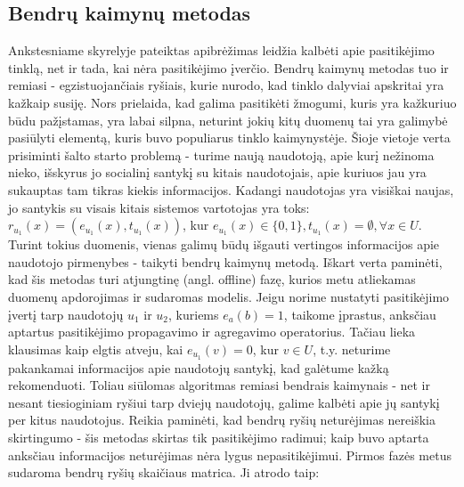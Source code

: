 \documentclass{VUMIFInfMagistrinis}
\begin{document}



\subsection{Bendrų kaimynų metodas}
Ankstesniame skyrelyje pateiktas apibrėžimas leidžia kalbėti apie pasitikėjimo tinklą, net ir tada, kai nėra pasitikėjimo įverčio. Bendrų kaimynų metodas tuo ir remiasi - egzistuojančiais ryšiais, kurie nurodo, kad tinklo dalyviai apskritai yra kažkaip susiję. Nors prielaida, kad galima pasitikėti žmogumi, kuris yra kažkuriuo būdu pažįstamas, yra labai silpna, neturint jokių kitų duomenų tai yra galimybė pasiūlyti elementą, kuris buvo populiarus tinklo kaimynystėje. 
\newline
\indent
Šioje vietoje verta prisiminti šalto starto problemą - turime naują naudotoją, apie kurį nežinoma nieko, išskyrus jo socialinį santykį su kitais naudotojais, apie kuriuos jau yra sukauptas tam tikras kiekis informacijos. Kadangi naudotojas yra visiškai naujas, jo santykis su visais kitais sistemos vartotojas yra toks: $r_{u_1}(x) = (e_{u_1}(x), t_{u_1}(x))$, kur $e_{u_1}(x)\in \{0,1\}, t_{u_1}(x) = \emptyset, \forall x \in U$. Turint tokius duomenis, vienas galimų būdų išgauti vertingos informacijos apie naudotojo pirmenybes - taikyti bendrų kaimynų metodą. Iškart verta paminėti, kad šis metodas turi atjungtinę (angl. offline) fazę, kurios metu atliekamas duomenų apdorojimas ir sudaromas modelis. 
\newline
\indent
Jeigu norime nustatyti pasitikėjimo įvertį tarp naudotojų $u_1$ ir $u_2$, kuriems $e_a(b)=1$, taikome įprastus, anksčiau aptartus pasitikėjimo propagavimo ir agregavimo operatorius. Tačiau lieka klausimas kaip elgtis atveju, kai $e_{u_1}(v)=0$, kur $v \in U$, t.y. neturime pakankamai informacijos apie naudotojų santykį, kad galėtume kažką rekomenduoti. Toliau siūlomas algoritmas remiasi bendrais kaimynais - net ir nesant tiesioginiam ryšiui tarp dviejų naudotojų, galime kalbėti apie jų santykį per kitus naudotojus. Reikia paminėti, kad bendrų ryšių neturėjimas nereiškia skirtingumo - šis metodas skirtas tik pasitikėjimo radimui; kaip buvo aptarta anksčiau informacijos neturėjimas nėra lygus nepasitikėjimui.
\newline
\indent
Pirmos fazės metus sudaroma bendrų ryšių skaičiaus matrica. Ji atrodo taip: 
\end{document}
